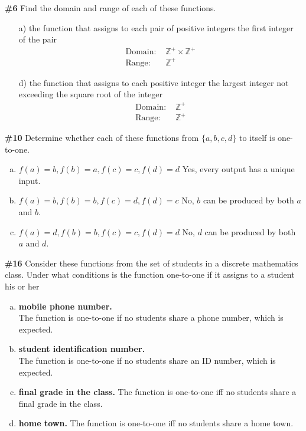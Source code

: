 \documentclass{article}
\newcommand{\problem}[1]{\textbf{\##1}}
\newcommand{\prob}[1]{\problem{#1}}
\newcommand{\AllIntegers}{\mathbb{Z}}
\begin{document}
\pagebreak
\prob{6}
Find the domain and range of each of these functions.

\begin{enumerate}
    \item [a)] the function that assigns to each pair of positive integers the first integer of the pair
    \begin{align*}
        \text{Domain: } &\AllIntegers^{+} \times \AllIntegers^{+}\\
        \text{Range: } &\AllIntegers^{+}
    \end{align*}
    \item [d)] the function that assigns to each positive integer the
    largest integer not exceeding the square root of the integer
    \begin{align*}
        \text{Domain: } &\AllIntegers^{+}\\
        \text{Range: } &\AllIntegers^{+}
    \end{align*}
\end{enumerate}

\pagebreak
\prob{10}
Determine whether each of these functions from
\(\{a, b, c, d\}\) to itself is one-to-one.

\begin{enumerate}[a)]
    \item \(f(a)=b, f(b)=a, f(c)=c,f(d)=d\) Yes, every output has a unique input.
    \item \(f(a) = b, f(b) = b, f(c) = d, f(d) = c\) No, \(b\) can be produced by both \(a\) and \(b\).
    \item \(f(a) = d, f(b) = b, f(c) = c, f(d) = d\) No, \(d\) can be produced by both \(a\) and \(d\).
\end{enumerate}

\pagebreak
\prob{16}
Consider these functions from the set of students in a discrete mathematics class. Under what conditions is the function one-to-one if it assigns to a student his or her

\begin{enumerate}[a)]
    \item \textbf{mobile phone number.}\\
    The function is one-to-one if no students share a phone number, which is expected.
    \item \textbf{student identification number.}\\
    The function is one-to-one if no students share an ID number, which is expected.
    \item \textbf{final grade in the class.}
    The function is one-to-one iff no students share a final grade in the class. 
    \item \textbf{home town.}
    The function is one-to-one iff no students share a home town.
\end{enumerate}
\end{document}
